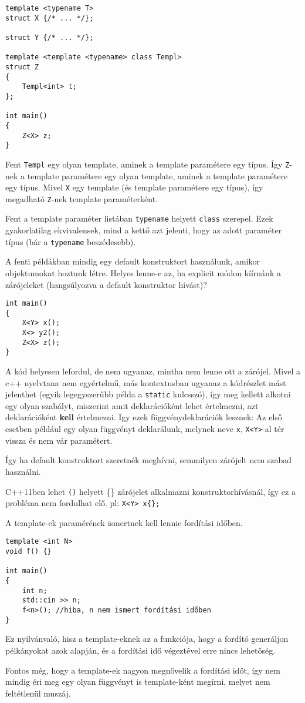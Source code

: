 \documentclass[a4paper,11.5pt,table]{article}
\begin{document}
\begin{lstlisting}
template <typename T>
struct X {/* ... */};

struct Y {/* ... */};

template <template <typename> class Templ>
struct Z
{
	Templ<int> t;
};

int main()
{
	Z<X> z;
}
\end{lstlisting}
	Fent \texttt{Templ} egy olyan template, aminek a template paramétere egy típus. Így \texttt{Z}-nek a template paramétere egy olyan template, aminek a template paramétere egy típus. Mivel \texttt{X} egy template (és template paramétere egy típus), így megadható \texttt{Z}-nek template paraméterként.
	\begin{note}
		Fent a template paraméter listában \texttt{typename} helyett \texttt{class} szerepel. Ezek gyakorlatilag ekvivalensek, mind a kettő azt jelenti, hogy az adott paraméter típus (bár a \texttt{typename} beszédesebb).
	\end{note}
	
	A fenti példákban mindig egy default konstruktort használunk, amikor objektumokat hoztunk létre. Helyes lenne-e az, ha explicit módon kíírnánk a zárójeleket (hangsúlyozva a default konstruktor hívást)?
\begin{lstlisting}
int main()
{
	X<Y> x();
	X<> y2();
	Z<X> z();
}
\end{lstlisting}
	A kód helyesen lefordul, de nem ugyanaz, mintha nem lenne ott a zárójel. Mivel a c++ nyelvtana nem egyértelmű, más kontextusban ugyanaz a kódrészlet mást jelenthet (egyik legegyszerűbb példa a \texttt{static} kulcsszó), így meg kellett alkotni egy olyan szabályt, miszerint amit deklarációként lehet értelmezni, azt deklarációként \textbf{kell} értelmezni. Igy ezek függvénydeklarációk lesznek: Az első esetben például egy olyan függvényt deklarálunk, melynek neve \texttt{x}, \texttt{X<Y>}-al tér vissza és nem vár paramétert. 
	
	Így ha default konstruktort szeretnék meghívni, semmilyen zárójelt nem szabad használni.
	\begin{note}
		C++11ben lehet \texttt{()} helyett \{\} zárójelet alkalmazni konstruktorhívásnál, így ez a probléma nem fordulhat elő. pl: \texttt{X<Y> x\{\};}
	\end{note}
	
	A template-ek paramérének ismertnek kell lennie fordítási időben.
	\begin{lstlisting}
template <int N>
void f() {}

int main()
{
	int n;
	std::cin >> n;
	f<n>(); //hiba, n nem ismert fordítási időben
}
	\end{lstlisting}
	Ez nyilvánvaló, hisz a template-eknek az a funkciója, hogy a fordító generáljon pélkányokat azok alapján, és a fordítási idő végeztével erre nincs lehetőség.
	\begin{note}
		Fontos még, hogy a template-ek nagyon megnövelik a fordítási időt, így nem mindig éri meg egy olyan függvényt is template-ként megírni, melyet nem feltétlenül muszáj.
	\end{note}
\end{document}
